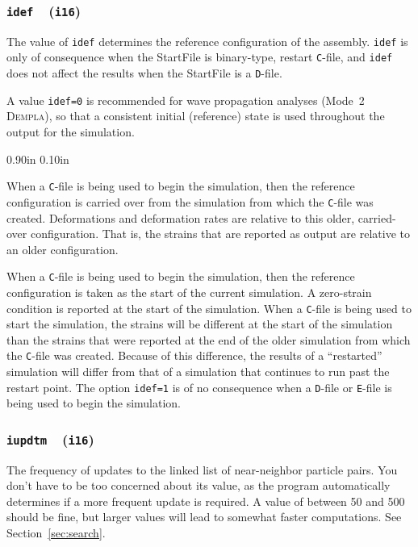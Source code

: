 \documentclass[letterpaper,11pt]{article}
\newcommand{\Dempla}{\textsc{Dempla}}
\newcommand{\Var}[2]{\texttt{#1}\ \  (\texttt{#2})}
\newlength{\Labelwidth}
\newcommand{\Entrylabel}[1]{\makebox[\Labelwidth][r]{\texttt{#1}}}
\newenvironment{Options}
{\begin{list}{}{%
\renewcommand{\makelabel}{\Entrylabel}%
\setlength{\leftmargin} {0.90in}%
\setlength{\rightmargin}{0.00in}%
\setlength{\labelsep}   {0.10in}%
\setlength{\labelwidth} {\Labelwidth}%
}}
{\end{list}}
\begin{document}
\subsubsection[\texttt{idef}]{\Var{idef}{i16}}\label{sec:idef}
The value of \texttt{idef} determines the reference configuration
of the assembly. 
\texttt{idef} is only of consequence when the
\textsf{StartFile} is binary-type, restart \texttt{C}-file, and
\texttt{idef} does not affect the results when the \textsf{StartFile} is 
a \texttt{D}-file.
\par
A value \texttt{idef=0} is recommended for wave propagation
analyses (Mode~2 \Dempla ),
so that a consistent initial (reference) state is used throughout
the output for the simulation.
%
\begin{Options}
\item[idef=0]
When a \texttt{C}-file is being used to begin the simulation,
then the reference configuration is carried over from the 
simulation from which the \texttt{C}-file was created.
Deformations and deformation rates are relative 
to this older, carried-over configuration.  That is, the strains
that are reported as output are relative to an older configuration.
\item[idef=1]
When a \texttt{C}-file is being used to begin the simulation,
then the reference configuration is taken as the start of the current
simulation.
A zero-strain condition is reported at the start of the simulation.
When a \texttt{C}-file is being used to start the simulation, the strains
will be different at the start of the simulation than the strains that
were reported at the end of the older simulation from which
the \texttt{C}-file was created.
Because of this difference, the results of a ``restarted'' simulation will
differ from that of a simulation that continues to run past the 
restart point.
The option \texttt{idef=1} is of no consequence when 
a \texttt{D}-file or \texttt{E}-file is being used to begin the simulation.
\end{Options}
%
\subsubsection[\texttt{iupdtm}]{\Var{iupdtm}{i16}}\label{sec:iupdtm}
The frequency of updates to the linked list of near-neighbor particle pairs.
You don't have to be too concerned about its value, as the
program automatically determines if a more frequent update is required.
A value of between 50 and 500 should be fine, but larger values will
lead to somewhat faster computations.  See Section~\ref{sec:search}.
%
\end{document}
